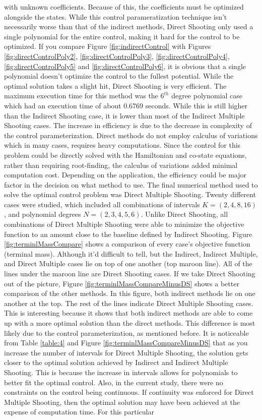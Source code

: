\documentclass[]{article}
\begin{document}
with unknown coefficients. Because of this, the coefficients must be optimized alongside the states. While this control parameratization technique isn't necessarily worse than that of the indirect methods, Direct Shooting only used a single polynomial for the entire control, making it hard for the control to be optimized. If you compare Figure \ref{fig:indirectControl} with Figures \ref{fig:directControlPoly2}, \ref{fig:directControlPoly3}, \ref{fig:directControlPoly4}, \ref{fig:directControlPoly5} and \ref{fig:directControlPoly6}, it is obvious that a single polynomial doesn't optimize the control to the fullest potential. While the optimal solution takes a slight hit, Direct Shooting is very efficient. The maximum execution time for this method was the \(6^{th}\) degree polynomial case which had an execution time of about 0.6769 seconds. While this is still higher than the Indirect Shooting case, it is lower than most of the Indirect Multiple Shooting cases. The increase in efficiency is due to the decrease in complexity of the control parameterization. Direct methods do not employ calculus of variations which in many cases, requires heavy computations. Since the control for this problem could be directly solved with the Hamiltonian and co-state equations, rather than requiring root-finding, the calculus of variations added minimal computation cost. Depending on the application, the efficiency could be major factor in the decision on what method to use. The final numerical method used to solve the optimal control problem was Direct Multiple Shooting. Twenty different cases were studied, which included all combinations of intervals \(K = (2,4,8,16)\), and polynomial degrees \(N = (2,3,4,5,6)\). Unlike Direct Shooting, all combinations of Direct Multiple Shooting were able to minimize the objective function to an amount close to the baseline defined by Indirect Shooting. Figure \ref{fig:terminlMassCompare} shows a comparison of every case's objective function (terminal mass). Although it'd difficult to tell, but the Indirect, Indirect Multiple, and Direct Multiple cases lie on top of one another (top maroon line). All of the lines under the maroon line are Direct Shooting cases. If we take Direct Shooting out of the picture, Figure \ref{fig:terminlMassCompareMinusDS} shows a better comparison of the other methods. In this figure, both indirect methods lie on one another at the top. The rest of the lines indicate Direct Multiple Shooting cases. This is interesting because it shows that both indirect methods are able to come up with a more optimal solution than the direct methods. This difference is most likely due to the control parameterization, as mentioned before. It is noticeable from Table \ref{table:4} and Figure \ref{fig:terminlMassCompareMinusDS} that as you increase the number of intervals for Direct Multiple Shooting, the solution gets closer to the optimal solution achieved by Indirect and Indirect Multiple Shooting. This is because the increase in intervals allows for polynomials to better fit the optimal control. Also, in the current study, there were no constraints on the control being continuous. If continuity was enforced for Direct Multiple Shooting, then the optimal solution may have been achieved at the expense of computation time. For this particular 
\end{document}
